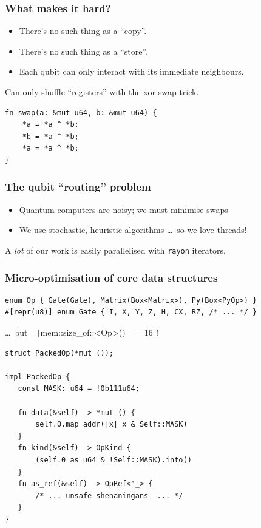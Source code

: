 \documentclass[presentation, 12pt, aspectratio=169, t]{beamer}
\begin{document}
\begin{frame}[fragile]\frametitle{What makes it hard?}
\begin{itemize}\baselineskip
\item There's no such thing as a ``copy''.
\item There's no such thing as a ``store''.
\item Each qubit can only interact with its immediate neighbours.
\end{itemize}
\pause
\medskip
\begin{block}{}
Can only shuffle ``registers'' with the xor swap trick.
\end{block}
\medskip
\begin{verbatim}
fn swap(a: &mut u64, b: &mut u64) {
    *a = *a ^ *b;
    *b = *a ^ *b;
    *a = *a ^ *b;
}
\end{verbatim}
\end{frame}

\begin{frame}\frametitle{The qubit ``routing'' problem}
\begin{itemize}\baselineskip
\item Quantum computers are noisy; we must minimise swaps
\item We use stochastic, heuristic algorithms \ldots\ so we love threads!
\end{itemize}
\bigskip
\begin{block}{}
A \emph{lot} of our work is easily parallelised with \texttt{rayon} iterators.
\end{block}
\end{frame}

\begin{frame}[fragile]\frametitle{Micro-optimisation of core data structures}
\footnotesize
\begin{verbatim}
enum Op { Gate(Gate), Matrix(Box<Matrix>), Py(Box<PyOp>) }
#[repr(u8)] enum Gate { I, X, Y, Z, H, CX, RZ, /* ... */ }
\end{verbatim}
\pause
\smallskip
\ldots\ but\ \ \texttt|mem::size_of::<Op>() == 16|\,!
\bigskip\bigskip
\pause
\scriptsize%
\begin{verbatim}
struct PackedOp(*mut ());

impl PackedOp {
   const MASK: u64 = !0b111u64;

   fn data(&self) -> *mut () {
       self.0.map_addr(|x| x & Self::MASK)
   }
   fn kind(&self) -> OpKind {
       (self.0 as u64 & !Self::MASK).into()
   }
   fn as_ref(&self) -> OpRef<'_> {
       /* ... unsafe shenaningans  ... */
   }
}   
\end{verbatim}
\end{frame}
\end{document}
